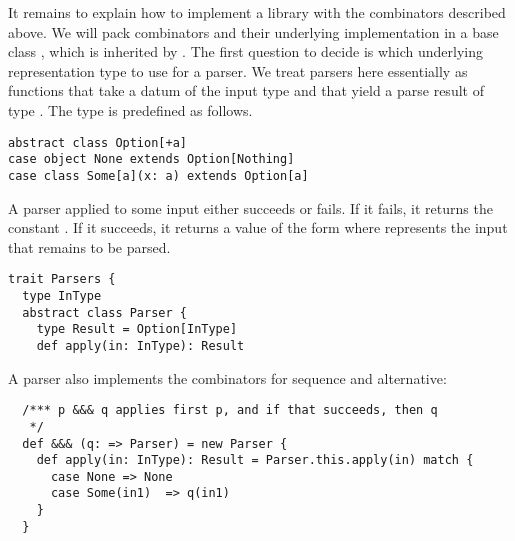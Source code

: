 {{It remains to explain how to implement a library with the combinators
described above. We will pack combinators and their underlying
implementation in a base class , which is inherited by
.  The first question to decide is which underlying
representation type to use for a parser. We treat parsers here
essentially as functions that take a datum of the input type
 and that yield a parse result of type
.  The  type is predefined as
follows.
\begin{lstlisting}
abstract class Option[+a]
case object None extends Option[Nothing]
case class Some[a](x: a) extends Option[a]
\end{lstlisting}
A parser applied to some input either succeeds or fails. If it fails,
it returns the constant . If it succeeds, it returns a
value of the form  where  represents the
input that remains to be parsed.
\begin{lstlisting}
trait Parsers {
  type InType
  abstract class Parser {
    type Result = Option[InType]
    def apply(in: InType): Result
\end{lstlisting}
A parser also implements the combinators
for sequence and alternative:
\begin{lstlisting}
  /*** p &&& q applies first p, and if that succeeds, then q
   */
  def &&& (q: => Parser) = new Parser {
    def apply(in: InType): Result = Parser.this.apply(in) match {
      case None => None
      case Some(in1)  => q(in1)
    }
  }


\end{lstlisting}}}
